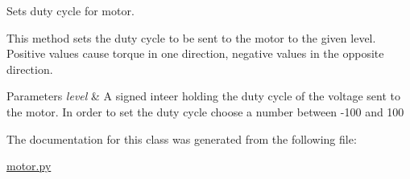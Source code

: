 Sets duty cycle for motor. 

This method sets the duty cycle to be sent to the motor to the given level. Positive values cause torque in one direction, negative values in the opposite direction.


\begin{DoxyParams}{Parameters}
{\em level} & A signed inteer holding the duty cycle of the voltage sent to the motor. In order to set the duty cycle choose a number between -\/100 and 100 \\
\hline
\end{DoxyParams}


The documentation for this class was generated from the following file\+:\begin{DoxyCompactItemize}
\item 
\mbox{\hyperlink{motor_8py}{motor.\+py}}\end{DoxyCompactItemize}
